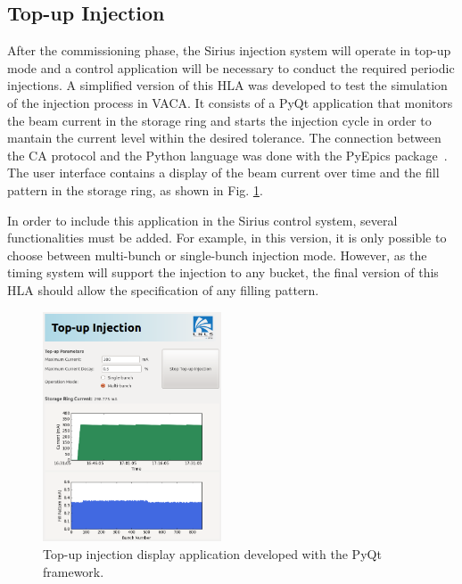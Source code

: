 \subsection{Top-up Injection}

After the commissioning phase, the Sirius injection system will operate in top-up mode and a control application will be necessary to conduct the required periodic injections. A simplified version of this HLA was developed to test the simulation of the injection process in VACA. It consists of a PyQt application that monitors the beam current in the storage ring and starts the injection cycle in order to mantain the current level within the desired tolerance. The connection between the CA protocol and the Python language was done with the PyEpics package~\cite{pyepics}. The user interface contains a display of the beam current over time and the fill pattern in the storage ring, as shown in Fig. \ref{fig:topup}.

In order to include this application in the Sirius control system, several functionalities must be added. For example, in this version, it is only possible to 
choose between multi-bunch or single-bunch injection mode. However, as the timing system will support the injection to any bucket, the final version of this HLA should allow the specification of any filling pattern.


\begin{figure}[!htb]
   \centering
   \includegraphics*[width=150pt]{WEPOPRPO22f4}
   \caption{Top-up injection display application developed with the PyQt framework.}
   \label{fig:topup}
\end{figure}

